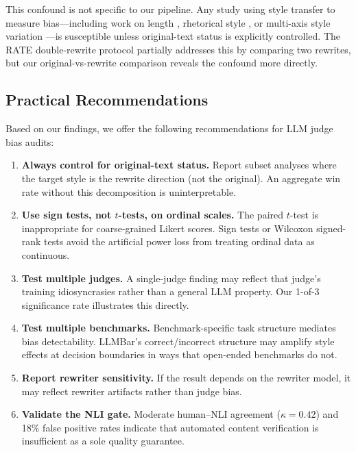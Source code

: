 \documentclass[11pt,a4paper]{article}
\begin{document}
This confound is not specific to our pipeline. Any study using style transfer to measure bias---including work on length \citep{dubois2024alpacaeval}, rhetorical style \citep{counterfactual_rhetorical2025}, or multi-axis style variation \citep{casse2026}---is susceptible unless original-text status is explicitly controlled. The RATE double-rewrite protocol \citep{rate2025} partially addresses this by comparing two rewrites, but our original-vs-rewrite comparison reveals the confound more directly.

\subsection{Practical Recommendations}
\label{sec:recommendations}

Based on our findings, we offer the following recommendations for LLM judge bias audits:

\begin{enumerate}
    \item \textbf{Always control for original-text status.} Report subset analyses where the target style is the rewrite direction (not the original). An aggregate win rate without this decomposition is uninterpretable.
    \item \textbf{Use sign tests, not $t$-tests, on ordinal scales.} The paired $t$-test is inappropriate for coarse-grained Likert scores. Sign tests or Wilcoxon signed-rank tests avoid the artificial power loss from treating ordinal data as continuous.
    \item \textbf{Test multiple judges.} A single-judge finding may reflect that judge's training idiosyncrasies rather than a general LLM property. Our 1-of-3 significance rate illustrates this directly.
    \item \textbf{Test multiple benchmarks.} Benchmark-specific task structure mediates bias detectability. LLMBar's correct/incorrect structure may amplify style effects at decision boundaries in ways that open-ended benchmarks do not.
    \item \textbf{Report rewriter sensitivity.} If the result depends on the rewriter model, it may reflect rewriter artifacts rather than judge bias.
    \item \textbf{Validate the NLI gate.} Moderate human--NLI agreement ($\kappa=0.42$) and 18\% false positive rates indicate that automated content verification is insufficient as a sole quality guarantee.
\end{enumerate}
\end{document}
